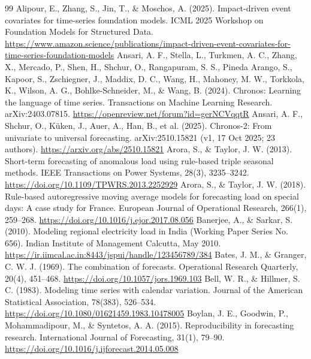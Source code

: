\documentclass[review,12pt,authoryear]{elsarticle}
\begin{document}
\begingroup\raggedright
\begin{thebibliography}{99}
Alipour, E., Zhang, S., Jin, T., \& Moschos, A. (2025). Impact-driven event covariates for time-series foundation models. ICML 2025 Workshop on Foundation Models for Structured Data. \url{https://www.amazon.science/publications/impact-driven-event-covariates-for-time-series-foundation-models}
Ansari, A. F., Stella, L., Turkmen, A. C., Zhang, X., Mercado, P., Shen, H., Shchur, O., Rangapuram, S. S., Pineda Arango, S., Kapoor, S., Zschiegner, J., Maddix, D. C., Wang, H., Mahoney, M. W., Torkkola, K., Wilson, A. G., Bohlke-Schneider, M., \& Wang, B. (2024). Chronos: Learning the language of time series. Transactions on Machine Learning Research. arXiv:2403.07815. \url{https://openreview.net/forum?id=gerNCVqqtR}
Ansari, A. F., Shchur, O., Küken, J., Auer, A., Han, B., et al. (2025). Chronos-2: From univariate to universal forecasting. arXiv:2510.15821 (v1, 17 Oct 2025; 23 authors). \url{https://arxiv.org/abs/2510.15821}
Arora, S., \& Taylor, J. W. (2013). Short-term forecasting of anomalous load using rule-based triple seasonal methods. IEEE Transactions on Power Systems, 28(3), 3235–3242. \url{https://doi.org/10.1109/TPWRS.2013.2252929}
Arora, S., \& Taylor, J. W. (2018). Rule-based autoregressive moving average models for forecasting load on special days: A case study for France. European Journal of Operational Research, 266(1), 259–268. \url{https://doi.org/10.1016/j.ejor.2017.08.056}
Banerjee, A., \& Sarkar, S. (2010). Modeling regional electricity load in India (Working Paper Series No. 656). Indian Institute of Management Calcutta, May 2010. \url{https://ir.iimcal.ac.in:8443/jspui/handle/123456789/384}
Bates, J. M., \& Granger, C. W. J. (1969). The combination of forecasts. Operational Research Quarterly, 20(4), 451–468. \url{https://doi.org/10.1057/jors.1969.103}
Bell, W. R., \& Hillmer, S. C. (1983). Modeling time series with calendar variation. Journal of the American Statistical Association, 78(383), 526–534. \url{https://doi.org/10.1080/01621459.1983.10478005}
Boylan, J. E., Goodwin, P., Mohammadipour, M., \& Syntetos, A. A. (2015). Reproducibility in forecasting research. International Journal of Forecasting, 31(1), 79–90. \url{https://doi.org/10.1016/j.ijforecast.2014.05.008}

\end{thebibliography}
\end{document}

